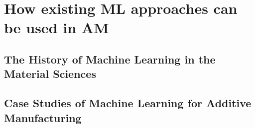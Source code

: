 \section{How existing ML approaches can be used in AM}

\subsection{The History of Machine Learning in the Material Sciences}

\subsection{Case Studies of Machine Learning for Additive Manufacturing}
